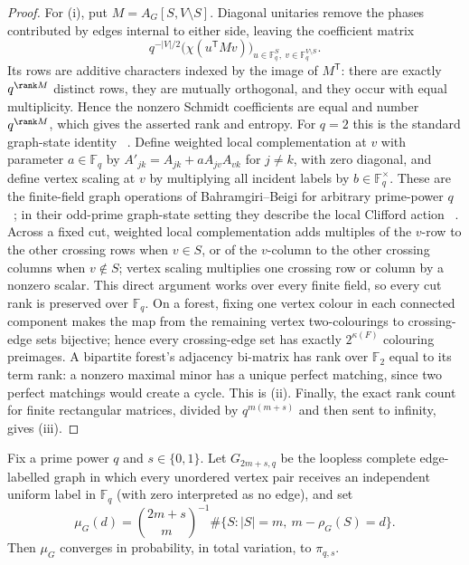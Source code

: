 \begin{proof}
For \textup{(i)}, put $M=A_G[S,V\setminus S]$.  Diagonal unitaries remove the
phases contributed by edges internal to either side, leaving the coefficient
matrix
\[
 q^{-|V|/2}\bigl(\chi(u^{\mathsf T}Mv)\bigr)_
 {u\in\mathbb F_q^S,\ v\in\mathbb F_q^{V\setminus S}}.
\]
Its rows are additive characters indexed by the image of $M^{\mathsf T}$:
there are exactly $q^{\rank M}$ distinct rows, they are mutually orthogonal,
and they occur with equal multiplicity.  Hence the nonzero Schmidt
coefficients are equal and number $q^{\rank M}$, which gives the asserted
rank and entropy.  For $q=2$ this is the standard graph-state identity
~\cite{HeinEisertBriegel04}.  Define weighted local complementation at $v$
with parameter $a\in\mathbb F_q$ by
$A'_{jk}=A_{jk}+aA_{jv}A_{vk}$ for $j\ne k$, with zero diagonal, and define
vertex scaling at $v$ by multiplying all incident labels by
$b\in\mathbb F_q^\times$.  These are the finite-field graph operations of
Bahramgiri--Beigi for arbitrary prime-power $q$
~\cite{BahramgiriBeigiEnumerating07}; in their odd-prime graph-state setting
they describe the local Clifford action
~\cite{BahramgiriBeigiNonbinary06}.  Across a fixed cut, weighted local
complementation adds multiples of the $v$-row to the other crossing rows
when $v\in S$, or of the $v$-column to the other crossing columns when
$v\notin S$; vertex scaling multiplies one crossing row or column by a
nonzero scalar.  This direct argument works over every finite field, so every
cut rank is preserved over $\mathbb F_q$.  On a forest, fixing one vertex
colour in each connected component makes the map from the remaining vertex
two-colourings to crossing-edge sets bijective; hence every crossing-edge set
has exactly $2^{\kappa(F)}$ colouring preimages.  A bipartite forest's
adjacency bi-matrix has rank over
$\mathbb F_2$ equal to its term rank: a nonzero maximal minor has a unique
perfect matching, since two perfect matchings would create a cycle.  This is
\textup{(ii)}.  Finally, the exact rank count for finite rectangular matrices,
divided by $q^{m(m+s)}$ and then sent to infinity, gives \textup{(iii)}.
\end{proof}

\begin{conjecture}\label{as1}
Fix a prime power $q$ and $s\in\{0,1\}$.  Let $G_{2m+s,q}$ be the loopless
complete edge-labelled graph in which every unordered vertex pair receives
an independent uniform label in $\mathbb F_q$ (with zero interpreted as no
edge), and set
\[
 \mu_G(d)=\binom{2m+s}{m}^{-1}
 \#\{S:|S|=m,\ m-\rho_G(S)=d\}.
\]
Then $\mu_G$ converges in probability, in total variation, to
$\pi_{q,s}$.
\end{conjecture}

